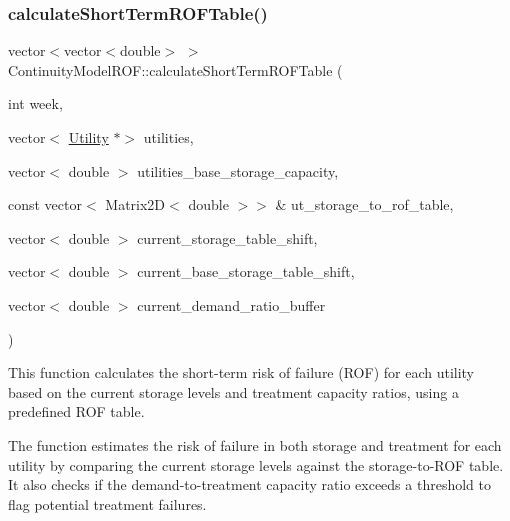 \subsubsection{\texorpdfstring{calculate\+Short\+Term\+R\+O\+F\+Table()}{calculateShortTermROFTable()}}
{\footnotesize\ttfamily vector$<$vector$<$double$>$ $>$ Continuity\+Model\+R\+O\+F\+::calculate\+Short\+Term\+R\+O\+F\+Table (\begin{DoxyParamCaption}\item[{int}]{week,  }\item[{vector$<$ \mbox{\hyperlink{classUtility}{Utility}} $\ast$$>$}]{utilities,  }\item[{vector$<$ double $>$}]{utilities\+\_\+base\+\_\+storage\+\_\+capacity,  }\item[{const vector$<$ Matrix2D$<$ double $>$$>$ \&}]{ut\+\_\+storage\+\_\+to\+\_\+rof\+\_\+table,  }\item[{vector$<$ double $>$}]{current\+\_\+storage\+\_\+table\+\_\+shift,  }\item[{vector$<$ double $>$}]{current\+\_\+base\+\_\+storage\+\_\+table\+\_\+shift,  }\item[{vector$<$ double $>$}]{current\+\_\+demand\+\_\+ratio\+\_\+buffer }\end{DoxyParamCaption})}



This function calculates the short-\/term risk of failure (R\+OF) for each utility based on the current storage levels and treatment capacity ratios, using a predefined R\+OF table. 

The function estimates the risk of failure in both storage and treatment for each utility by comparing the current storage levels against the storage-\/to-\/\+R\+OF table. It also checks if the demand-\/to-\/treatment capacity ratio exceeds a threshold to flag potential treatment failures.


